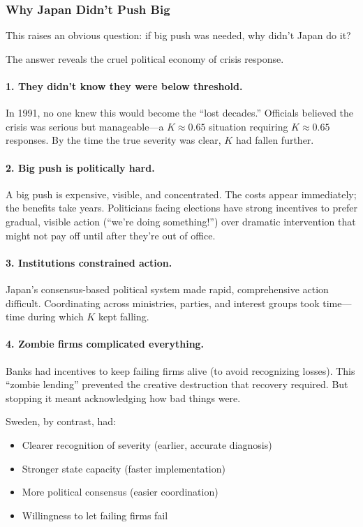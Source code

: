 \subsubsection{Why Japan Didn't Push Big}

This raises an obvious question: if big push was needed, why didn't Japan do it?

The answer reveals the cruel political economy of crisis response.

\paragraph{1. They didn't know they were below threshold.}
In 1991, no one knew this would become the ``lost decades.'' Officials 
believed the crisis was serious but manageable---a $K \approx 0.65$ situation 
requiring $K \approx 0.65$ responses. By the time the true severity was clear, 
$K$ had fallen further.

\paragraph{2. Big push is politically hard.}
A big push is expensive, visible, and concentrated. The costs appear 
immediately; the benefits take years. Politicians facing elections have 
strong incentives to prefer gradual, visible action (``we're doing something!'') 
over dramatic intervention that might not pay off until after they're out of office.

\paragraph{3. Institutions constrained action.}
Japan's consensus-based political system made rapid, comprehensive action 
difficult. Coordinating across ministries, parties, and interest groups 
took time---time during which $K$ kept falling.

\paragraph{4. Zombie firms complicated everything.}
Banks had incentives to keep failing firms alive (to avoid recognizing losses). 
This ``zombie lending'' prevented the creative destruction that recovery required. 
But stopping it meant acknowledging how bad things were.

Sweden, by contrast, had:
\begin{itemize}
    \item Clearer recognition of severity (earlier, accurate diagnosis)
    \item Stronger state capacity (faster implementation)
    \item More political consensus (easier coordination)
    \item Willingness to let failing firms fail
\end{itemize}

